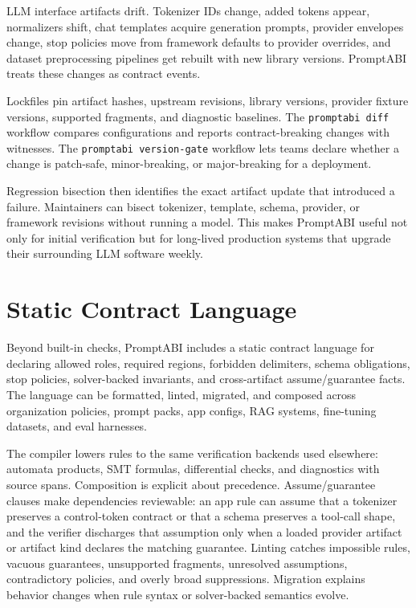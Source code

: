 \documentclass[10pt]{article}
\begin{document}
LLM interface artifacts drift. Tokenizer IDs change, added tokens appear,
normalizers shift, chat templates acquire generation prompts, provider
envelopes change, stop policies move from framework defaults to provider
overrides, and dataset preprocessing pipelines get rebuilt with new library
versions. PromptABI treats these changes as contract events.

Lockfiles pin artifact hashes, upstream revisions, library versions, provider
fixture versions, supported fragments, and diagnostic baselines. The
\texttt{promptabi diff} workflow compares configurations and reports
contract-breaking changes with witnesses. The \texttt{promptabi version-gate}
workflow lets teams declare whether a change is patch-safe, minor-breaking, or
major-breaking for a deployment.

Regression bisection then identifies the exact artifact update that introduced
a failure. Maintainers can bisect tokenizer, template, schema, provider, or
framework revisions without running a model. This makes PromptABI useful not
only for initial verification but for long-lived production systems that upgrade
their surrounding LLM software weekly.

\newpage
\section{Static Contract Language}

Beyond built-in checks, PromptABI includes a static contract language for
declaring allowed roles, required regions, forbidden delimiters, schema
obligations, stop policies, solver-backed invariants, and cross-artifact
assume/guarantee facts. The language can be formatted, linted, migrated, and
composed across organization policies, prompt packs, app configs, RAG systems,
fine-tuning datasets, and eval harnesses.

The compiler lowers rules to the same verification backends used elsewhere:
automata products, SMT formulas, differential checks, and diagnostics with
source spans. Composition is explicit about precedence. Assume/guarantee clauses
make dependencies reviewable: an app rule can assume that a tokenizer preserves a
control-token contract or that a schema preserves a tool-call shape, and the
verifier discharges that assumption only when a loaded provider artifact or
artifact kind declares the matching guarantee. Linting catches impossible rules,
vacuous guarantees, unsupported fragments, unresolved assumptions,
contradictory policies, and overly broad suppressions. Migration explains
behavior changes when rule syntax or solver-backed semantics evolve.
\end{document}
